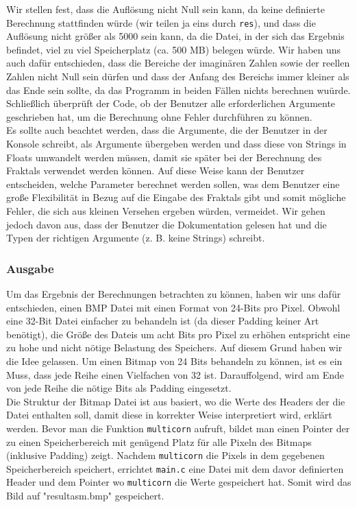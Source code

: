 \documentclass[course=erap]{aspdoc}
\begin{document}
Wir stellen fest, dass die Aufl\"osung nicht Null sein kann, da keine definierte Berechnung stattfinden w\"urde (wir teilen ja eins durch \lstinline{res}), und dass die Aufl\"osung nicht gr\"oßer als 5000 sein kann, da die Datei, in der sich das Ergebnis befindet, viel zu viel Speicherplatz (ca. 500 MB) belegen w\"urde. Wir haben uns auch daf\"ur entschieden, dass die Bereiche der imagin\"aren Zahlen sowie der reellen Zahlen nicht Null sein d\"urfen und dass der Anfang des Bereichs immer kleiner als das Ende sein sollte, da das Programm in beiden F\"allen nichts berechnen wu\"urde. Schließlich \"uberpr\"uft der Code, ob der Benutzer alle erforderlichen Argumente geschrieben hat, um die Berechnung ohne Fehler durchf\"uhren zu k\"onnen. \\

Es sollte auch beachtet werden, dass die Argumente, die der Benutzer in der Konsole schreibt, als Argumente \"ubergeben werden und dass diese von Strings in Floats umwandelt werden m\"ussen, damit sie sp\"ater bei der Berechnung des Fraktals verwendet werden k\"onnen. Auf diese Weise kann der Benutzer entscheiden, welche Parameter berechnet werden sollen, was dem Benutzer eine große Flexibilit\"at in Bezug auf die Eingabe des Fraktals gibt und somit m\"ogliche Fehler, die sich aus kleinen Versehen ergeben w\"urden, vermeidet. Wir gehen jedoch davon aus, dass der Benutzer die Dokumentation gelesen hat und die Typen der richtigen Argumente (z. B. keine Strings) schreibt.

\subsubsection{Ausgabe}

Um das Ergebnis der Berechnungen betrachten zu k\"onnen, haben wir uns daf\"ur entschieden, einen BMP Datei mit einen Format von 24-Bits pro Pixel. Obwohl eine 32-Bit Datei einfacher zu behandeln ist (da dieser Padding keiner Art ben\"otigt), die Gr\"o{\ss}e des Dateis um acht Bits pro Pixel zu erh\"ohen entspricht eine zu hohe und nicht n\"otige Belastung des Speichers. Auf diesem Grund haben wir die Idee gelassen. Um einen Bitmap von 24 Bits behandeln zu k\"onnen, ist es ein Muss, dass jede Reihe einen Vielfachen von 32 ist. Darauffolgend, wird am Ende von jede Reihe die n\"otige Bits als Padding eingesetzt. \\

Die Struktur der Bitmap Datei ist aus \cite{BMP_file_format} basiert, wo die Werte des Headers der die Datei enthalten soll, damit diese in korrekter Weise interpretiert wird, erkl\"art werden. Bevor man die Funktion \lstinline{multicorn} aufruft, bildet man einen Pointer der zu einen Speicherbereich mit gen\"ugend Platz f\"ur alle Pixeln des Bitmaps (inklusive Padding) zeigt. Nachdem \lstinline{multicorn} die Pixels in dem gegebenen Speicherbereich speichert, errichtet \lstinline{main.c} eine Datei mit dem davor definierten Header und dem Pointer wo \lstinline{multicorn} die Werte gespeichert hat. Somit wird das Bild auf "result\textunderscore asm.bmp" gespeichert. \\
\end{document}
